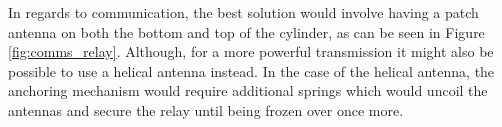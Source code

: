 In regards to communication, the best solution would involve having a patch antenna on both the bottom and top of the cylinder, as can be seen in Figure \ref{fig:comms_relay}. Although, for a more powerful transmission it might also be possible to use a helical antenna instead. In the case of the helical antenna, the anchoring mechanism would require additional springs which would uncoil the antennas and secure the relay until being frozen over once more.

